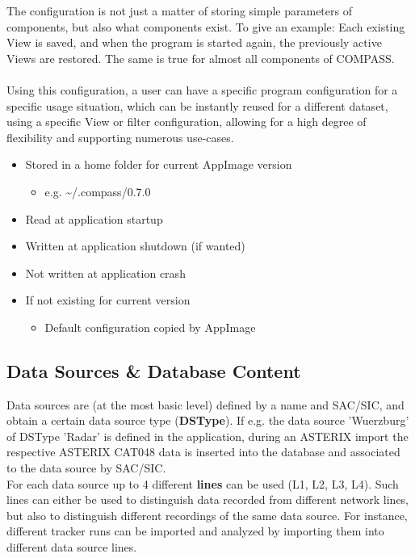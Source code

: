 The configuration is not just a matter of storing simple parameters of components, but also what components exist. To give an example: Each existing View is saved, and when the program is started again, the previously active Views are restored. The same is true for almost all components of COMPASS. \\\\

Using this configuration, a user can have a specific program configuration for a specific usage situation, which can be instantly reused for a different dataset, using a specific View or filter configuration, allowing for a high degree of flexibility and supporting numerous use-cases. \\


\begin{itemize}
\item Stored in a home folder for current AppImage version
\begin{itemize}
\item e.g. \textasciitilde/.compass/0.7.0
\end{itemize}
\item Read at application startup
\item Written at application shutdown (if wanted)
\item Not written at application crash
\item If not existing for current version
\begin{itemize}
\item Default configuration copied by AppImage
\end{itemize}
\end{itemize}

\subsection*{Data Sources \& Database Content}

Data sources are (at the most basic level) defined by a name and SAC/SIC, and obtain a certain data source type (\textbf{DSType}). 
If e.g. the data source 'Wuerzburg' of DSType 'Radar' is defined in the application, during an ASTERIX import the respective ASTERIX CAT048 data is inserted into the database and associated to the data source by SAC/SIC. \\

For each data source up to 4 different \textbf{lines} can be used (L1, L2, L3, L4). 
Such lines can either be used to distinguish data recorded from different network lines, but also to distinguish different recordings of the same data source. 
For instance, different tracker runs can be imported and analyzed by importing them into different data source lines. \\

